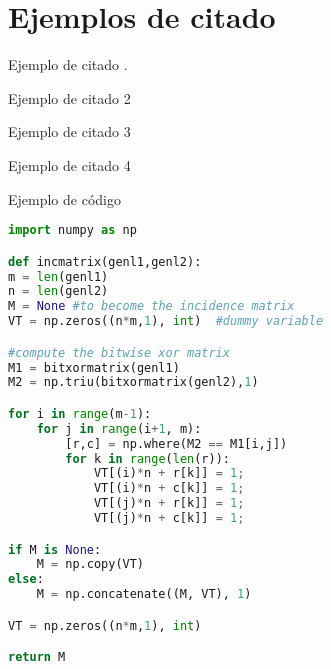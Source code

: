 \section{Ejemplos de citado}

Ejemplo de citado \cite{Vickrey1961}.

Ejemplo de citado 2 

Ejemplo de citado 3 \cite{baggio}

Ejemplo de citado 4 

Ejemplo de código

\begin{lstlisting}[language=Python, caption=Python example]
import numpy as np

def incmatrix(genl1,genl2):
m = len(genl1)
n = len(genl2)
M = None #to become the incidence matrix
VT = np.zeros((n*m,1), int)  #dummy variable

#compute the bitwise xor matrix
M1 = bitxormatrix(genl1)
M2 = np.triu(bitxormatrix(genl2),1) 

for i in range(m-1):
	for j in range(i+1, m):
		[r,c] = np.where(M2 == M1[i,j])
		for k in range(len(r)):
			VT[(i)*n + r[k]] = 1;
			VT[(i)*n + c[k]] = 1;
			VT[(j)*n + r[k]] = 1;
			VT[(j)*n + c[k]] = 1;

if M is None:
	M = np.copy(VT)
else:
	M = np.concatenate((M, VT), 1)

VT = np.zeros((n*m,1), int)

return M
\end{lstlisting}